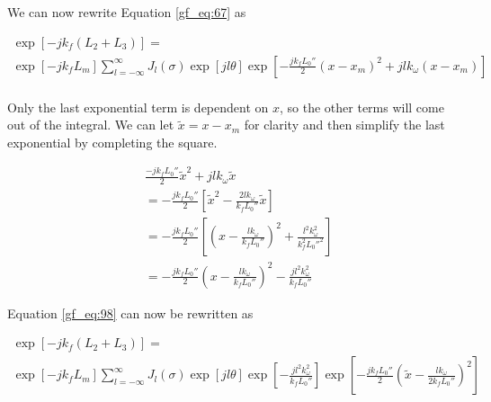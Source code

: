\noindent We can now rewrite Equation \ref{gf_eq:67} as

\begin{equation}
\begin{gathered}
\exp\left[-jk_f\left( L_2 + L_3\right) \right]= \\
\exp\left[-jk_fL_m\right]\sum_{l=-\infty}^{\infty}J_l(\sigma)\exp\left[jl\theta\right]
\exp\left[-\frac{jk_fL_0''}{2}(x-x_m)^2+jlk_{\omega}(x-x_m)\right]\\
\label{gf_eq:98}
\end{gathered}
\end{equation}
\renewcommand{\baselinestretch}{2} \small\normalsize

Only the last exponential term is dependent on $x$, so the other terms will come out of the integral. We can let $\tilde{x} = x-x_m$ for clarity and then simplify the last exponential by completing the square.

\begin{equation}
\begin{aligned}
&\frac{-jk_fL_0''}{2}\tilde{x}^2+jlk_{\omega}\tilde{x}\\
&=-\frac{jk_fL_0''}{2}\left[\tilde{x}^2 - \frac{2lk_{\omega}}{k_fL_0''}\tilde{x} \right]\\
&=-\frac{jk_fL_0''}{2}\left[\left(x-\frac{lk_{\omega}}{k_fL_0''} \right)^2 + \frac{l^2k_{\omega}^2}{k_f^2L_0''^2} \right]\\
&=-\frac{jk_fL_0''}{2}\left(x-\frac{lk_{\omega}}{k_fL_0''} \right)^2 - \frac{jl^2k_{\omega}^2}{k_fL_0''} 
\label{gf_eq:99}
\end{aligned}
\end{equation}
\renewcommand{\baselinestretch}{2} \small\normalsize

\noindent Equation \ref{gf_eq:98} can now be rewritten as

\begin{equation}
\begin{gathered}
\exp\left[-jk_f\left( L_2 + L_3\right) \right]= \\
\exp\left[-jk_fL_m\right]\sum_{l=-\infty}^{\infty}J_l(\sigma)\exp\left[jl\theta\right]
\exp\left[- \frac{jl^2k_{\omega}^2}{k_fL_0''} \right]\exp\left[-\frac{jk_fL_0''}{2}\left(\tilde{x}-\frac{lk_{\omega}}{2k_fL_0''} \right)^2\right]\\
\label{gf_eq:100}
\end{gathered}
\end{equation}
\renewcommand{\baselinestretch}{2} \small\normalsize

